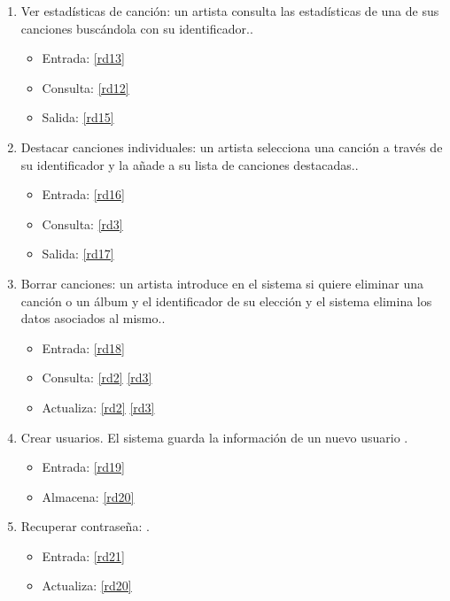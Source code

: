 \documentclass[12pt,a4paper]{article}
\begin{document}
\begin{enumerate}[label=\textnormal{RF\arabic*.}]
	 \item Ver estadísticas de canción: un artista consulta las estadísticas de una de sus canciones buscándola con su identificador.\label{rf9}.
    	\begin{itemize}
			\item Entrada: \ref{rd13}
			\item Consulta: \ref{rd12}
			\item Salida: \ref{rd15}
		\end{itemize}
		
	 \item Destacar canciones individuales: un artista selecciona una canción a través de su identificador y la añade a su lista de canciones destacadas.\label{rf10}.
    	\begin{itemize}
			\item Entrada: \ref{rd16}
			\item Consulta: \ref{rd3}
			\item Salida: \ref{rd17}
		\end{itemize}
		
	 \item Borrar canciones: un artista introduce en el sistema si quiere eliminar una canción o un álbum y el identificador de su elección y el sistema elimina los datos asociados al mismo.\label{rf11}.
    	\begin{itemize}
			\item Entrada: \ref{rd18}
			\item Consulta: \ref{rd2} \ref{rd3} 
			\item Actualiza: \ref{rd2} \ref{rd3} 
		\end{itemize}
		
		
	 \item Crear usuarios. El sistema guarda la información de un nuevo usuario \label{rf12}.
    	\begin{itemize}
			\item Entrada: \ref{rd19}
			\item Almacena: \ref{rd20}
		\end{itemize}
		
	 \item Recuperar contraseña: \label{rf13}.
    	\begin{itemize}
			\item Entrada: \ref{rd21}
			\item Actualiza: \ref{rd20}
		\end{itemize}
		

\end{enumerate}
\end{document}
